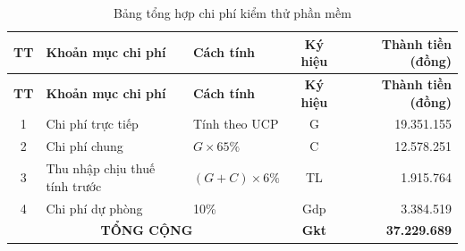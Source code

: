 \begin{longtable}{|c|p{4.5cm}|p{3.5cm}|c|r|}
\caption{Bảng tổng hợp chi phí kiểm thử phần mềm \label{tab:chi_phi_ktpm}} \\
\hline
\textbf{TT} & \textbf{Khoản mục chi phí} & \textbf{Cách tính} & \textbf{Ký hiệu} & \textbf{Thành tiền (đồng)} \\ \hline
\endfirsthead
\hline
\textbf{TT} & \textbf{Khoản mục chi phí} & \textbf{Cách tính} & \textbf{Ký hiệu} & \textbf{Thành tiền (đồng)} \\ \hline
\endhead
\hline
1 & Chi phí trực tiếp & Tính theo UCP & G & 19.351.155 \\ \hline
2 & Chi phí chung & $G\times 65\%$ & C & 12.578.251 \\ \hline
3 & Thu nhập chịu thuế tính trước & $(G+C)\times 6\%$ & TL & 1.915.764 \\ \hline
4 & Chi phí dự phòng & 10\% & Gdp & 3.384.519 \\ \hline
\multicolumn{3}{|c|}{\textbf{TỔNG CỘNG}} & \textbf{Gkt} & \textbf{37.229.689} \\ \hline
\end{longtable}

